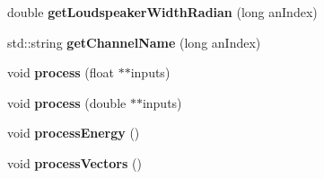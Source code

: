 \begin{DoxyCompactItemize}
\item 
\hypertarget{class_ambisonics_meter_a1147487c544561c5865e93603c72f2a3}{double {\bfseries get\-Loudspeaker\-Width\-Radian} (long an\-Index)}\label{class_ambisonics_meter_a1147487c544561c5865e93603c72f2a3}

\item 
\hypertarget{class_ambisonics_meter_aaf6d66a0e5ab0043c7780ee298f7d927}{std\-::string {\bfseries get\-Channel\-Name} (long an\-Index)}\label{class_ambisonics_meter_aaf6d66a0e5ab0043c7780ee298f7d927}

\item 
\hypertarget{class_ambisonics_meter_aec2469b7c4257c8cf14b7fca0638b49b}{void {\bfseries process} (float $\ast$$\ast$inputs)}\label{class_ambisonics_meter_aec2469b7c4257c8cf14b7fca0638b49b}

\item 
\hypertarget{class_ambisonics_meter_a6b25ca0c6429a4ba0462852433b9fd62}{void {\bfseries process} (double $\ast$$\ast$inputs)}\label{class_ambisonics_meter_a6b25ca0c6429a4ba0462852433b9fd62}

\item 
\hypertarget{class_ambisonics_meter_a95b73d96270c11538421b02d9143a567}{void {\bfseries process\-Energy} ()}\label{class_ambisonics_meter_a95b73d96270c11538421b02d9143a567}

\item 
\hypertarget{class_ambisonics_meter_a837f99343b8d0dbf2c01000d419d48ee}{void {\bfseries process\-Vectors} ()}\label{class_ambisonics_meter_a837f99343b8d0dbf2c01000d419d48ee}

\end{DoxyCompactItemize}
